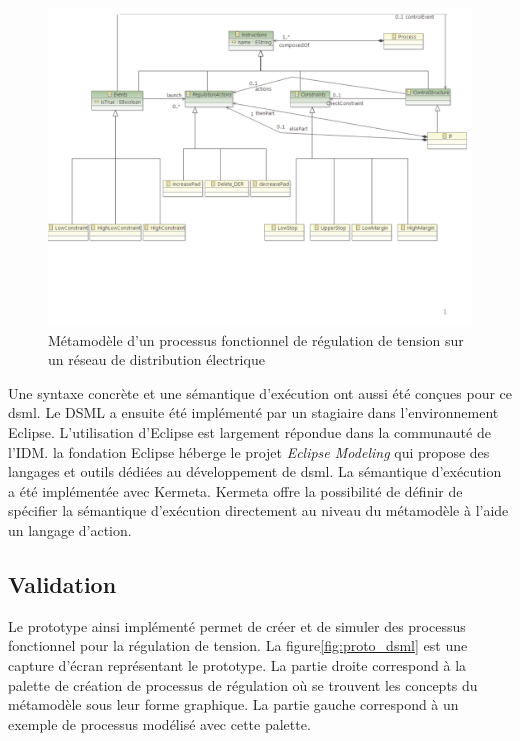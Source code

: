 \begin{figure}[!ht]
 \begin{center}
  \includegraphics[trim = 0cm 3cm 0cm 0cm, width=1\textwidth]{figures/6_methodologie/metamodele_dsml.pdf}
 \end{center}
 \caption{Métamodèle d'un processus fonctionnel de régulation de tension sur un réseau de distribution électrique}
 \label{fig:meta_dsml}
\end{figure} 

Une syntaxe concrète et une sémantique d'exécution ont aussi été conçues pour ce \gls{dsml}. Le DSML a ensuite été implémenté par un stagiaire dans l'environnement Eclipse. L'utilisation d'Eclipse est largement répondue dans la communauté de l'IDM. la fondation Eclipse héberge le projet \textit{Eclipse Modeling }qui propose des langages et outils dédiées au développement de \gls{dsml}. La sémantique d'exécution a été implémentée avec Kermeta. Kermeta offre la possibilité de définir de spécifier la sémantique d'exécution directement au niveau du métamodèle à l'aide un langage d'action. 

		
			\subsection{Validation}
Le prototype ainsi implémenté permet de créer et de simuler des processus fonctionnel pour la régulation de tension. La figure\ref{fig:proto_dsml} est une capture d'écran représentant le prototype. La partie droite correspond à la palette de création de processus de régulation où se trouvent les concepts du métamodèle sous leur forme graphique. La partie gauche correspond à un exemple de processus modélisé avec cette palette. 

